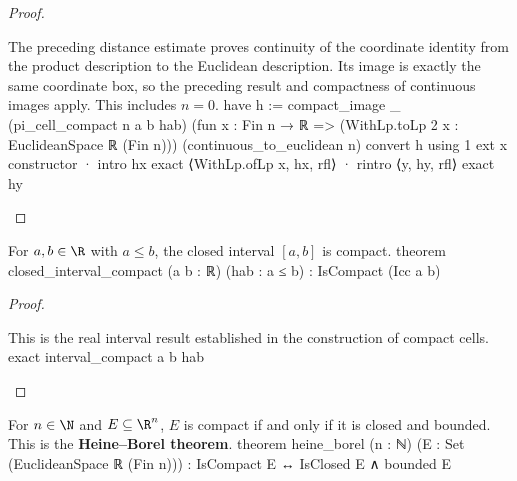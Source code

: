\begin{proof}
  \begin{lean}{The preceding distance estimate proves continuity of the coordinate identity from the product description to the Euclidean description. Its image is exactly the same coordinate box, so the preceding result and compactness of continuous images apply. This includes $n=0$.}
    have h := compact_image _ (pi_cell_compact n a b hab)
      (fun x : Fin n → ℝ => (WithLp.toLp 2 x : EuclideanSpace ℝ (Fin n)))
      (continuous_to_euclidean n)
    convert h using 1
    ext x
    constructor
    · intro hx
      exact ⟨WithLp.ofLp x, hx, rfl⟩
    · rintro ⟨y, hy, rfl⟩
      exact hy
  \end{lean}

\end{proof}

\begin{corollary} \label{an1:cor:closed-interval-in-R-is-compact}
  \begin{lean}{For $a,b\in\R$ with $a\leq b$, the closed interval $[a,b]$ is compact.}
    theorem closed_interval_compact (a b : ℝ) (hab : a ≤ b) : IsCompact (Icc a b)
  \end{lean}
\end{corollary}

\begin{proof}
  \begin{lean}{This is the real interval result established in the construction of compact cells.}
    exact interval_compact a b hab
  \end{lean}

\end{proof}

\begin{theorem} \label{an1:thm:heine-borel-theorem}
  \begin{lean}{For $n\in\N$ and $E\subseteq\R^{n}$, $E$ is compact if and only if it is closed and bounded. This is the \textbf{Heine--Borel theorem}.}
    theorem heine_borel (n : ℕ) (E : Set (EuclideanSpace ℝ (Fin n))) :
        IsCompact E ↔ IsClosed E ∧ bounded E
  \end{lean}
\end{theorem}

